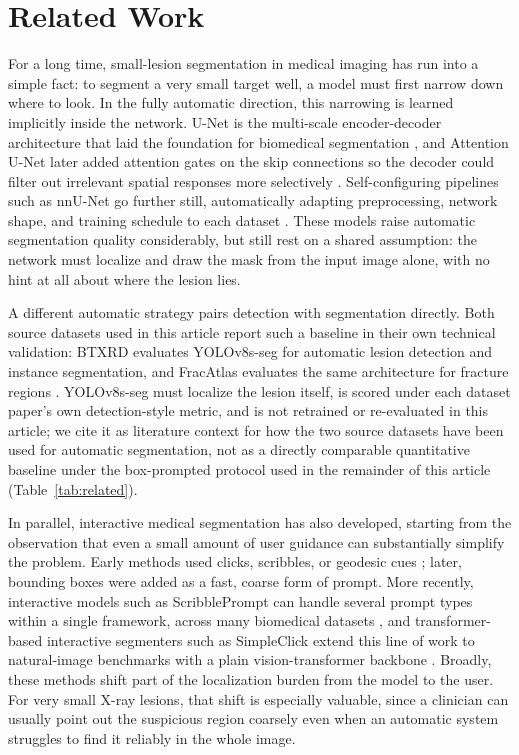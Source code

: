 \section{Related Work}
For a long time, small-lesion segmentation in medical imaging has run into a simple fact: to segment a very small target well, a model must first narrow down where to look. In the fully automatic direction, this narrowing is learned implicitly inside the network. U-Net is the multi-scale encoder-decoder architecture that laid the foundation for biomedical segmentation \cite{b3}, and Attention U-Net later added attention gates on the skip connections so the decoder could filter out irrelevant spatial responses more selectively \cite{b4}. Self-configuring pipelines such as nnU-Net go further still, automatically adapting preprocessing, network shape, and training schedule to each dataset \cite{b10}. These models raise automatic segmentation quality considerably, but still rest on a shared assumption: the network must localize and draw the mask from the input image alone, with no hint at all about where the lesion lies.

A different automatic strategy pairs detection with segmentation directly. Both source datasets used in this article report such a baseline in their own technical validation: BTXRD evaluates YOLOv8s-seg for automatic lesion detection and instance segmentation, and FracAtlas evaluates the same architecture for fracture regions \cite{b7,b8}. YOLOv8s-seg must localize the lesion itself, is scored under each dataset paper's own detection-style metric, and is not retrained or re-evaluated in this article; we cite it as literature context for how the two source datasets have been used for automatic segmentation, not as a directly comparable quantitative baseline under the box-prompted protocol used in the remainder of this article (Table~\ref{tab:related}).

In parallel, interactive medical segmentation has also developed, starting from the observation that even a small amount of user guidance can substantially simplify the problem. Early methods used clicks, scribbles, or geodesic cues \cite{b5,b6}; later, bounding boxes were added as a fast, coarse form of prompt. More recently, interactive models such as ScribblePrompt can handle several prompt types within a single framework, across many biomedical datasets \cite{b11}, and transformer-based interactive segmenters such as SimpleClick extend this line of work to natural-image benchmarks with a plain vision-transformer backbone \cite{b17}. Broadly, these methods shift part of the localization burden from the model to the user. For very small X-ray lesions, that shift is especially valuable, since a clinician can usually point out the suspicious region coarsely even when an automatic system struggles to find it reliably in the whole image.

